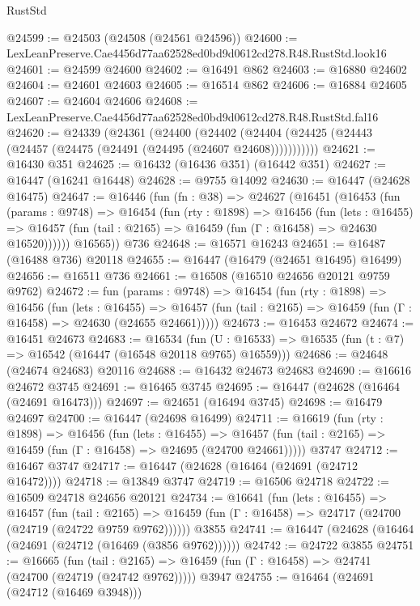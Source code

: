 \begin{lexlean}{RustStd}
\begin{coremodule}
@24599 := @24503 (@24508 (@24561 @24596))
@24600 := LexLeanPreserve.Cae4456d77aa62528ed0bd9d0612cd278.R48.RustStd.look16
@24601 := @24599 @24600
@24602 := @16491 @862
@24603 := @16880 @24602
@24604 := @24601 @24603
@24605 := @16514 @862
@24606 := @16884 @24605
@24607 := @24604 @24606
@24608 := LexLeanPreserve.Cae4456d77aa62528ed0bd9d0612cd278.R48.RustStd.fal16
@24620 := @24339
    (@24361
      (@24400
        (@24402 (@24404 (@24425 (@24443 (@24457 (@24475 (@24491 (@24495 (@24607 @24608)))))))))))
@24621 := @16430 @351
@24625 := @16432 (@16436 @351) (@16442 @351)
@24627 := @16447 (@16241 @16448)
@24628 := @9755 @14092
@24630 := @16447 (@24628 @16475)
@24647 := @16446
    (fun (fn : @38) =>
    @24627
      (@16451
        (@16453
          (fun (params : @9748) =>
          @16454
            (fun (rty : @1898) =>
            @16456
              (fun (lets : @16455) =>
              @16457 (fun (tail : @2165) => @16459 (fun (Γ : @16458) => @24630 @16520))))))
        @16565))
    @736
@24648 := @16571 @16243
@24651 := @16487 (@16488 @736) @20118
@24655 := @16447 (@16479 (@24651 @16495) @16499)
@24656 := @16511 @736
@24661 := @16508 (@16510 @24656 @20121 @9759 @9762)
@24672 := fun (params : @9748) =>
  @16454
    (fun (rty : @1898) =>
    @16456
      (fun (lets : @16455) =>
      @16457 (fun (tail : @2165) => @16459 (fun (Γ : @16458) => @24630 (@24655 @24661)))))
@24673 := @16453 @24672
@24674 := @16451 @24673
@24683 := @16534
    (fun (U : @16533) => @16535 (fun (t : @7) => @16542 (@16447 (@16548 @20118 @9765) @16559)))
@24686 := @24648 (@24674 @24683) @20116
@24688 := @16432 @24673 @24683
@24690 := @16616 @24672 @3745
@24691 := @16465 @3745
@24695 := @16447 (@24628 (@16464 (@24691 @16473)))
@24697 := @24651 (@16494 @3745)
@24698 := @16479 @24697
@24700 := @16447 (@24698 @16499)
@24711 := @16619
    (fun (rty : @1898) =>
    @16456
      (fun (lets : @16455) =>
      @16457 (fun (tail : @2165) => @16459 (fun (Γ : @16458) => @24695 (@24700 @24661)))))
    @3747
@24712 := @16467 @3747
@24717 := @16447 (@24628 (@16464 (@24691 (@24712 @16472))))
@24718 := @13849 @3747
@24719 := @16506 @24718
@24722 := @16509 @24718 @24656 @20121
@24734 := @16641
    (fun (lets : @16455) =>
    @16457
      (fun (tail : @2165) =>
      @16459 (fun (Γ : @16458) => @24717 (@24700 (@24719 (@24722 @9759 @9762))))))
    @3855
@24741 := @16447 (@24628 (@16464 (@24691 (@24712 (@16469 (@3856 @9762))))))
@24742 := @24722 @3855
@24751 := @16665
    (fun (tail : @2165) => @16459 (fun (Γ : @16458) => @24741 (@24700 (@24719 (@24742 @9762)))))
    @3947
@24755 := @16464 (@24691 (@24712 (@16469 @3948)))

\end{coremodule}
\end{lexlean}
